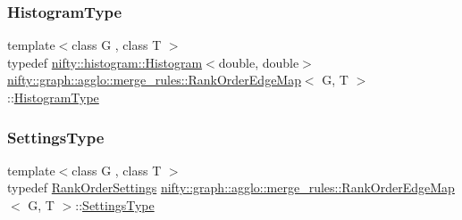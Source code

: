 \mbox{\label{classnifty_1_1graph_1_1agglo_1_1merge__rules_1_1RankOrderEdgeMap_a83f4d4fcda328512f9d91989e84a655a}} 
\subsubsection{\texorpdfstring{Histogram\+Type}{HistogramType}}
{\footnotesize\ttfamily template$<$class G , class T $>$ \\
typedef \hyperlink{classnifty_1_1histogram_1_1Histogram}{nifty\+::histogram\+::\+Histogram}$<$double, double$>$ \hyperlink{classnifty_1_1graph_1_1agglo_1_1merge__rules_1_1RankOrderEdgeMap}{nifty\+::graph\+::agglo\+::merge\+\_\+rules\+::\+Rank\+Order\+Edge\+Map}$<$ G, T $>$\+::\hyperlink{classnifty_1_1graph_1_1agglo_1_1merge__rules_1_1RankOrderEdgeMap_a83f4d4fcda328512f9d91989e84a655a}{Histogram\+Type}}

\mbox{\label{classnifty_1_1graph_1_1agglo_1_1merge__rules_1_1RankOrderEdgeMap_a6b6c608fd32fef4275091eba71bb6e1a}} 
\subsubsection{\texorpdfstring{Settings\+Type}{SettingsType}}
{\footnotesize\ttfamily template$<$class G , class T $>$ \\
typedef \hyperlink{structnifty_1_1graph_1_1agglo_1_1merge__rules_1_1RankOrderSettings}{Rank\+Order\+Settings} \hyperlink{classnifty_1_1graph_1_1agglo_1_1merge__rules_1_1RankOrderEdgeMap}{nifty\+::graph\+::agglo\+::merge\+\_\+rules\+::\+Rank\+Order\+Edge\+Map}$<$ G, T $>$\+::\hyperlink{classnifty_1_1graph_1_1agglo_1_1merge__rules_1_1RankOrderEdgeMap_a6b6c608fd32fef4275091eba71bb6e1a}{Settings\+Type}}

